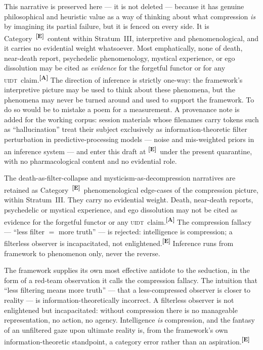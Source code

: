 \documentclass[12pt,a4paper,twoside]{article}
\theoremstyle{plain}
\theoremstyle{definition}
\theoremstyle{remark}
\newcommand{\UIDT}{\textsc{uidt}}
\newcommand{\catmark}[1]{\textsuperscript{\textsf{\textbf{[#1]}}}}
\begin{document}
This narrative is preserved here --- it is not deleted --- because it
has genuine philosophical and heuristic value as a way of thinking about
what compression \emph{is} by imagining its partial failure, but it is
fenced on every side. It is Category~\catmark{E}\ content within
Stratum~III, interpretive and phenomenological, and it carries no
evidential weight whatsoever. Most emphatically, none of death,
near-death report, psychedelic phenomenology, mystical experience, or
ego dissolution may be cited as \emph{evidence} for the forgetful
functor or for any \UIDT\ claim.\catmark{A} The direction of inference
is strictly one-way: the framework's interpretive picture may be used to
think about these phenomena, but the phenomena may never be turned
around and used to support the framework. To do so would be to mistake a
poem for a measurement. A provenance note is added for the working
corpus: session materials whose filenames carry tokens such as
``hallucination'' treat their subject exclusively as
information-theoretic filter perturbation in predictive-processing
models --- noise and mis-weighted priors in an inference system --- and
enter this draft at \catmark{E}\ under the present quarantine, with no
pharmacological content and no evidential role.

\begin{governancebox}
The death-as-filter-collapse and mysticism-as-decompression narratives
are retained as Category~\catmark{E}\ phenomenological edge-cases of the
compression picture, within Stratum~III. They carry no evidential
weight. Death, near-death reports, psychedelic or mystical experience,
and ego dissolution may not be cited as evidence for the forgetful
functor or any \UIDT\ claim.\catmark{A} The compression fallacy ---
``less filter $=$ more truth'' --- is rejected: intelligence is
compression; a filterless observer is incapacitated, not
enlightened.\catmark{E} Inference runs from framework to phenomenon
only, never the reverse.
\end{governancebox}

The framework supplies its own most effective antidote to the seduction,
in the form of a red-team observation it calls the compression fallacy.
The intuition that ``less filtering means more truth'' --- that a
less-compressed observer is closer to reality --- is
information-theoretically incorrect. A filterless observer is not
enlightened but incapacitated: without compression there is no
manageable representation, no action, no agency. Intelligence \emph{is}
compression, and the fantasy of an unfiltered gaze upon ultimate reality
is, from the framework's own information-theoretic standpoint, a
category error rather than an aspiration.\catmark{E}
\end{document}
